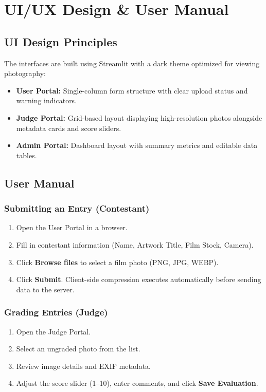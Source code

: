 \chapter{UI/UX Design \& User Manual}

\section{UI Design Principles}
The interfaces are built using Streamlit with a dark theme optimized for viewing photography:
\begin{itemize}
    \item \textbf{User Portal:} Single-column form structure with clear upload status and warning indicators.
    \item \textbf{Judge Portal:} Grid-based layout displaying high-resolution photos alongside metadata cards and score sliders.
    \item \textbf{Admin Portal:} Dashboard layout with summary metrics and editable data tables.
\end{itemize}

\section{User Manual}

\subsection{Submitting an Entry (Contestant)}
\begin{enumerate}
    \item Open the User Portal in a browser.
    \item Fill in contestant information (Name, Artwork Title, Film Stock, Camera).
    \item Click \textbf{Browse files} to select a film photo (PNG, JPG, WEBP).
    \item Click \textbf{Submit}. Client-side compression executes automatically before sending data to the server.
\end{enumerate}

\subsection{Grading Entries (Judge)}
\begin{enumerate}
    \item Open the Judge Portal.
    \item Select an ungraded photo from the list.
    \item Review image details and EXIF metadata.
    \item Adjust the score slider (1--10), enter comments, and click \textbf{Save Evaluation}.
\end{enumerate}